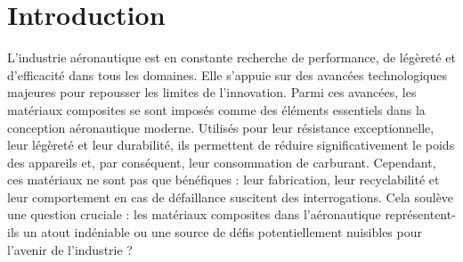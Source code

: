 

\chapter{Introduction}


L'industrie aéronautique est en constante recherche de performance, de légèreté et d'efficacité dans tous les domaines. Elle s'appuie sur des avancées technologiques majeures pour repousser les limites de l'innovation. Parmi ces avancées, les matériaux composites se sont imposés comme des éléments essentiels dans la conception aéronautique moderne. Utilisés pour leur résistance exceptionnelle, leur légèreté et leur durabilité, ils permettent de réduire significativement le poids des appareils et, par conséquent, leur consommation de carburant. Cependant, ces matériaux ne sont pas que bénéfiques : leur fabrication, leur recyclabilité et leur comportement en cas de défaillance suscitent des interrogations. Cela soulève une question cruciale : les matériaux composites dans l’aéronautique représentent-ils un atout indéniable ou une source de défis potentiellement nuisibles pour l’avenir de l’industrie ?









